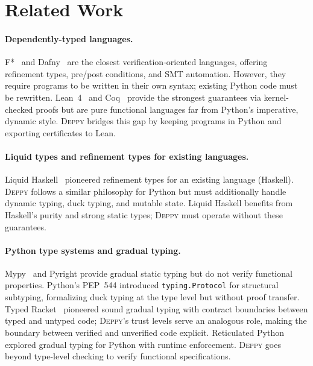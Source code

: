 \documentclass[acmsmall,nonacm,screen]{acmart}
\newcommand{\deppy}{\textsc{Deppy}}
\begin{document}

\section{Related Work}\label{sec:related}

\paragraph{Dependently-typed languages.}
F*~\cite{fstar} and Dafny~\cite{dafny} are the closest
verification-oriented languages, offering refinement types, pre/post
conditions, and SMT automation.  However, they require programs to be
written in their own syntax; existing Python code must be rewritten.
Lean~4~\cite{lean4} and Coq~\cite{coq} provide the strongest
guarantees via kernel-checked proofs but are pure functional languages
far from Python's imperative, dynamic style.  \deppy{} bridges this
gap by keeping programs in Python and exporting certificates to Lean.

\paragraph{Liquid types and refinement types for existing languages.}
Liquid Haskell~\cite{liquidhaskell} pioneered refinement types for
an existing language (Haskell).  \deppy{} follows a similar philosophy
for Python but must additionally handle dynamic typing, duck typing,
and mutable state.  Liquid Haskell benefits from Haskell's purity and
strong static types; \deppy{} must operate without these guarantees.

\paragraph{Python type systems and gradual typing.}
Mypy~\cite{mypy} and Pyright provide gradual static typing but do
not verify functional properties.  Python's PEP~544 introduced
\texttt{typing.Protocol} for structural subtyping, formalizing duck
typing at the type level but without proof transfer.  Typed
Racket~\cite{typedracket} pioneered sound gradual typing with
contract boundaries between typed and untyped code; \deppy{}'s trust
levels serve an analogous role, making the boundary between verified
and unverified code explicit.  Reticulated Python~\cite{reticulated}
explored gradual typing for Python with runtime enforcement.
\deppy{} goes beyond type-level checking to verify functional
specifications.
\end{document}
